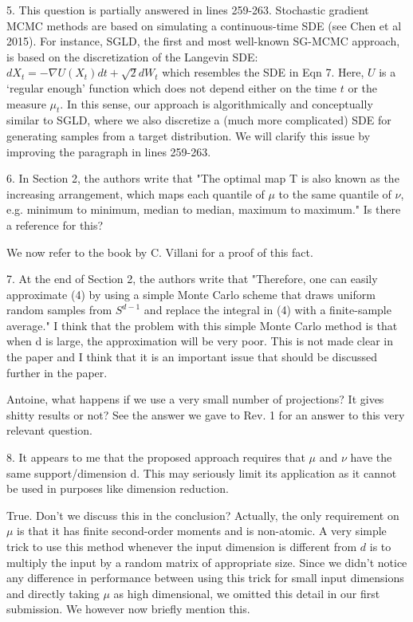 \documentclass{article}
\newcommand{\rev}[1]{{\color{red} #1}}
\newcommand{\umut}[1]{{\color{blue} #1}}
\newcommand{\antoine}[1]{{\color{orange} #1}}
\begin{document}
5. This question is partially answered in lines 259-263. Stochastic gradient MCMC methods are based on simulating a continuous-time SDE (see Chen et al 2015). For instance, SGLD, the first and most well-known SG-MCMC approach, is based on the discretization of the Langevin SDE: $d X_t = - \nabla U(X_t) dt + \sqrt{2} dW_t$ which resembles the SDE in Eqn 7. Here, $U$ is a `regular enough' function which does not depend either on the time $t$ or the measure $\mu_t$. In this sense, our approach is algorithmically and conceptually similar to SGLD, where we also discretize a (much more complicated) SDE for generating samples from a target distribution. We will clarify this issue by improving the paragraph in lines 259-263.

\rev{6. In Section 2, the authors write that "The optimal map T is also known as the increasing arrangement, which maps each quantile of $\mu$ to the same quantile of $\nu$, e.g. minimum to minimum, median to median, maximum to maximum." Is there a reference for this?}

\antoine{We now refer to the book by C. Villani for a proof of this fact.}

\rev{7. At the end of Section 2, the authors write that "Therefore, one can easily approximate (4) by using a simple Monte Carlo scheme that draws uniform random samples from $S^{d-1}$ and replace the integral in (4) with a finite-sample average." I think that the problem with this simple Monte Carlo method is that when d is large, the approximation will be very poor. This is not made clear in the paper and I think that it is an important issue that should be discussed further in the paper.}

\umut{Antoine, what happens if we use a very small number of projections? It gives shitty results or not?}
\antoine{See the answer we gave to Rev. 1 for an answer to this very relevant question.}

\rev{8. It appears to me that the proposed approach requires that $\mu$ and $\nu$ have the same support/dimension d. This may seriously limit its application as it cannot be used in purposes like dimension reduction.}

\umut{True. Don't we discuss this in the conclusion?}
\antoine{Actually, the only requirement on $\mu$ is that it has finite second-order moments and is non-atomic. A very simple trick to use this method whenever the input dimension is different from $d$ is to multiply the input by a random matrix of appropriate size. Since we didn't notice any difference in performance between using this trick for small input dimensions and directly taking $\mu$ as high dimensional, we omitted this detail in our first submission. We however now briefly mention this.}
\end{document}
